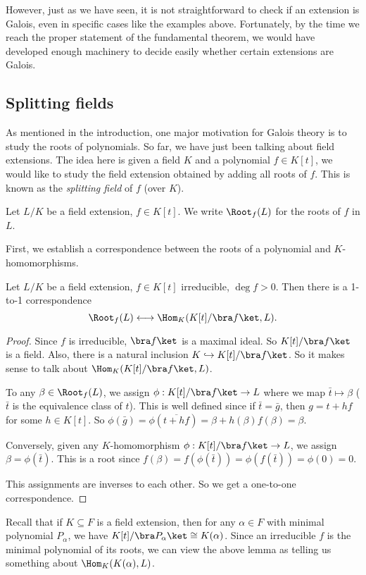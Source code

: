 \documentclass[a4paper]{article}
\begin{document}
However, just as we have seen, it is not straightforward to check if an extension is Galois, even in specific cases like the examples above. Fortunately, by the time we reach the proper statement of the fundamental theorem, we would have developed enough machinery to decide easily whether certain extensions are Galois.

\subsection{Splitting fields}
As mentioned in the introduction, one major motivation for Galois theory is to study the roots of polynomials. So far, we have just been talking about field extensions. The idea here is given a field $K$ and a polynomial $f \in K[t]$, we would like to study the field extension obtained by adding all roots of $f$. This is known as the \emph{splitting field} of $f$ (over $K$).

\begin{notation}
  Let $L/K$ be a field extension, $f\in K[t]$. We write $\Root_f(L)$ for the roots of $f$ in $L$.
\end{notation}

First, we establish a correspondence between the roots of a polynomial and $K$-homomorphisms.

\begin{lemma}
  Let $L/K$ be a field extension, $f\in K[t]$ irreducible, $\deg f > 0$. Then there is a 1-to-1 correspondence
  \[
    \Root_f(L)\longleftrightarrow \Hom_K(K[t]/\bra f\ket, L).
  \]
\end{lemma}

\begin{proof}
  Since $f$ is irreducible, $\bra f\ket$ is a maximal ideal. So $K[t] / \bra f\ket$ is a field. Also, there is a natural inclusion $K\hookrightarrow K[t] / \bra f\ket$. So it makes sense to talk about $\Hom_K(K[t]/\bra f\ket, L)$.

  To any $\beta\in \Root_f(L)$, we assign $\phi: K[t]/\bra f\ket \to L$ where we map $\bar t \mapsto \beta$ ($\bar t$ is the equivalence class of $t$). This is well defined since if $\bar{t} = \bar{g}$, then $g = t + hf$ for some $h \in K[t]$. So $\phi(\bar{g}) = \phi(\overline{t + hf}) = \beta + h(\beta) f(\beta) = \beta$.

  Conversely, given any $K$-homomorphism $\phi: K[t]/\bra f\ket \to L$, we assign $\beta = \phi(\bar t)$. This is a root since $f(\beta) = f(\phi(\bar t)) = \phi(f(\bar t)) = \phi(0) = 0$.

  This assignments are inverses to each other. So we get a one-to-one correspondence.
\end{proof}
Recall that if $K\subseteq F$ is a field extension, then for any $\alpha\in F$ with minimal polynomial $P_\alpha$, we have $K[t]/\bra P_\alpha\ket \cong K(\alpha)$. Since an irreducible $f$ is the minimal polynomial of its roots, we can view the above lemma as telling us something about $\Hom_K(K(\alpha), L)$.
\end{document}
